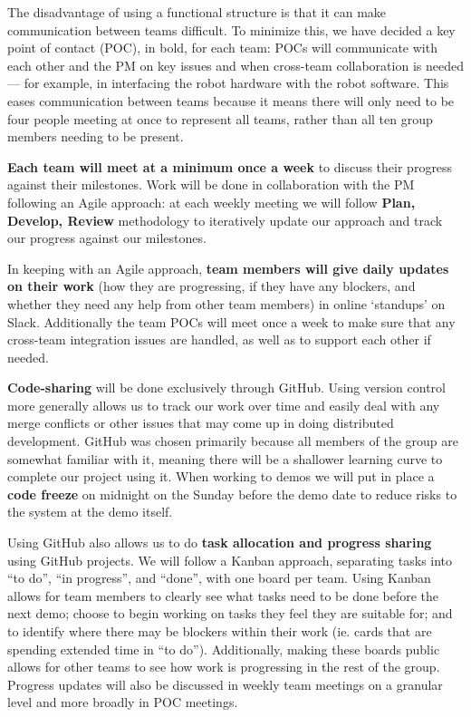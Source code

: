 \documentclass{article}
\begin{document}
The disadvantage of using a functional structure is that it can make communication between teams difficult. To minimize this, we have decided a key point of contact (POC), in bold, for each team: POCs will communicate with each other and the PM on key issues and when cross-team collaboration is needed --- for example, in interfacing the robot hardware with the robot software. This eases communication between teams because it means there will only need to be four people meeting at once to represent all teams, rather than all ten group members needing to be present.

{\bf Each team will meet at a minimum once a week} to discuss their progress against their milestones. Work will be done in collaboration with the PM following an Agile approach: at each weekly meeting we will follow {\bf Plan, Develop, Review} methodology to iteratively update our approach and track our progress against our milestones.

In keeping with an Agile approach, {\bf team members will give daily updates on their work} (how they are progressing, if they have any blockers, and whether they need any help from other team members) in online `standups' on Slack. Additionally the team POCs will meet once a week to make sure that any cross-team integration issues are handled, as well as to support each other if needed. 

{\bf Code-sharing} will be done exclusively through GitHub. Using version control more generally allows us to track our work over time and easily deal with any merge conflicts or other issues that may come up in doing distributed development. GitHub was chosen primarily because all members of the group are somewhat familiar with it, meaning there will be a shallower learning curve to complete our project using it. When working to demos we will put in place a {\bf code freeze} on midnight on the Sunday before the demo date to reduce risks to the system at the demo itself. 

Using GitHub also allows us to do {\bf task allocation and progress sharing} using GitHub projects. We will follow a Kanban approach, separating tasks into ``to do'', ``in progress'', and ``done'', with one board per team. Using Kanban allows for team members to clearly see what tasks need to be done before the next demo; choose to begin working on tasks they feel they are suitable for; and to identify where there may be blockers within their work (ie. cards that are spending extended time in ``to do''). Additionally, making these boards public allows for other teams to see how work is progressing in the rest of the group. Progress updates will also be discussed in weekly team meetings on a granular level and more broadly in POC meetings.
\end{document}
